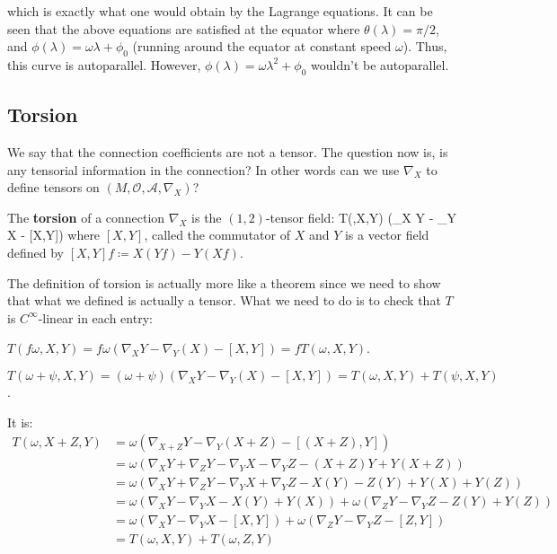 which is exactly what one would obtain by the Lagrange equations. It can be seen that the above equations are
satisfied at the equator where $\theta(\lambda) = \pi/2$, and $\phi(\lambda) = \omega\lambda + \phi_0$ (running
around the equator at constant speed $\omega$). Thus, this curve is autoparallel. However, $\phi(\lambda) =
\omega\lambda^2 + \phi_0$ wouldn't be autoparallel.
\ee

\subsection{Torsion}

We say that the connection coefficients are not a tensor. The question now is, is any tensorial information in the
connection? In other words can we use $\nabla_{X}$ to define tensors on $(M, \mathcal{O}, \mathscr{A},\nabla_{X})$?

\bd [Torsion]
The \textbf{torsion} of a connection $\nabla_X$ is the $(1,2)$-tensor field:
\bse
T(\omega,X,Y) \coloneqq \omega(\nabla_X Y - \nabla_Y X - [X,Y])
\ese
where $[X,Y]$, called the commutator of $X$ and $Y$ is a vector field defined by $[X,Y]f \coloneqq X(Yf) - Y(Xf)$.
\ed

The definition of torsion is actually more like a theorem since we need to show that what we defined is actually a
tensor. What we need to do is to check that $T$ is $C^{\infty}$-linear in each entry:
\bit
\item $T(f\omega, X, Y) = f\omega(\nabla_{X} Y - \nabla_Y (X) - [X,Y]) = fT(\omega, X, Y)$.
\item $T(\omega + \psi, X, Y) = (\omega + \psi)(\nabla_{X} Y - \nabla_Y (X) - [X,Y]) = T(\omega, X, Y) + T(\psi, X, Y)$.
\item It is:
\begin{align*}
T(\omega, X+Z, Y) & = \omega(\nabla_{X+Z} Y - \nabla_Y (X+Z) - [(X+Z), Y]) \\
& = \omega(\nabla_{X} Y + \nabla_{Z} Y - \nabla_{Y} X - \nabla_{Y} Z - (X+Z) Y + Y (X+Z)) \\
& = \omega(\nabla_{X} Y + \nabla_{Z} Y - \nabla_{Y} X + \nabla_{Y} Z - X (Y) - Z(Y) + Y(X) + Y(Z)) \\
& = \omega(\nabla_{X} Y - \nabla_{Y} X - X(Y) + Y(X)) + \omega (\nabla_{Z} Y - \nabla_{Y} Z - Z(Y) + Y(Z)) \\
& = \omega(\nabla_{X} Y - \nabla_{Y} X - [X,Y]) + \omega(\nabla_{Z} Y - \nabla_{Y} Z - [Z,Y]) \\
& = T(\omega, X, Y) + T(\omega, Z, Y)
\end{align*}

